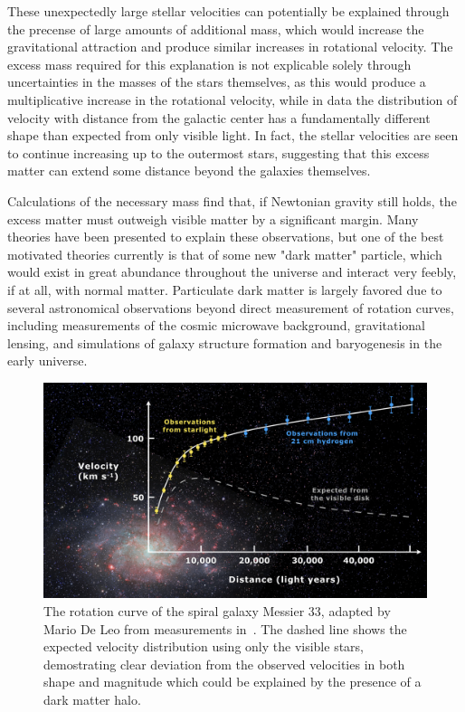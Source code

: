 These unexpectedly large stellar velocities can potentially be explained through the precense of large amounts of additional mass, which would increase the gravitational attraction and produce similar increases in rotational velocity. 
The excess mass required for this explanation is not explicable solely through uncertainties in the masses of the stars themselves, as this would produce a multiplicative increase in the rotational velocity, while in data the distribution of velocity with distance from the galactic center has a fundamentally different shape than expected from only visible light.
In fact, the stellar velocities are seen to continue increasing up to the outermost stars, suggesting that this excess matter can extend some distance beyond the galaxies themselves. 

Calculations of the necessary mass find that, if Newtonian gravity still holds, the excess matter must outweigh visible matter by a significant margin. 
Many theories have been presented to explain these observations, but one of the best motivated theories currently is that of some new "dark matter" particle, which would exist in great abundance throughout the universe and interact very feebly, if at all, with normal matter.
Particulate dark matter is largely favored due to several astronomical observations beyond direct measurement of rotation curves, including measurements of the cosmic microwave background, gravitational lensing, and simulations of galaxy structure formation and baryogenesis in the early universe.

\begin{figure}
   \label{fig:rotCurve}
   \centering
   \includegraphics[width=\textwidth]{figures/rotation_curve.png}
   \caption[Rotation curve of Messier 33]{The rotation curve of the spiral galaxy Messier 33, adapted by Mario De Leo from measurements in~\cite{Corbelli}. The dashed line shows the expected velocity distribution using only the visible stars, demostrating clear deviation from the observed velocities in both shape and magnitude which could be explained by the presence of a dark matter halo.}
\end{figure}

